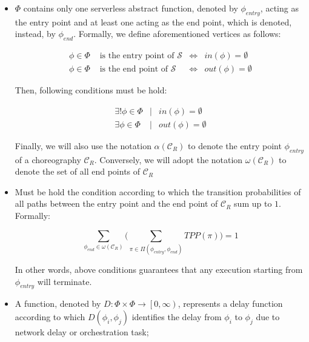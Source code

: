\begin{itemize}
	\item $\Phi$ contains only one serverless abstract function, denoted by $\phi_{entry}$, acting as the entry point and at least one acting as the end point, which is denoted, instead, by $\phi_{end}$. Formally, we define aforementioned vertices as follows: 
	
	\begin{equation}
		\begin{array}{lcll}
			\phi \in \Phi & \text{ is the entry point of } \mathcal{S} & \Leftrightarrow & in(\phi) = \emptyset \\
			\phi \in \Phi & \text{ is the end point of } \mathcal{S} & \Leftrightarrow & out(\phi) = \emptyset
		\end{array}
	\end{equation}
	
	Then, following conditions must be hold:
	
	\begin{eqnarray}
		\exists !  \phi \in \Phi &\mid & in(\phi) = \emptyset \label{cond1} \\
		\exists   \phi \in \Phi & \mid & out(\phi) = \emptyset \label{cond2}
	\end{eqnarray}
	
	Finally, we will also use the notation $\alpha(\mathcal{C}_R)$ to denote the entry point $\phi_{entry}$ of a choreography $\mathcal{C}_R$. Conversely, we will adopt the notation $\omega(\mathcal{C}_R)$ to denote the set of all end points of $\mathcal{C}_R$
		
	\item Must be hold the condition according to which the transition probabilities of all paths between the entry point and	the end point of $\mathcal{C}_R$ sum up to $1$. Formally:
	
	\begin{equation}\label{cond3}
		\sum_{\phi_{end} \in \omega(\mathcal{C}_R)} \Big( \sum_{\pi \in \Pi(\phi_{entry}, \phi_{end})} TPP(\pi) \Big) = 1
	\end{equation}
	
	In other words, above conditions guarantees that any execution starting from $\phi_{entry}$ will terminate.
	
	\item A function, denoted by $D : \Phi \times \Phi \to \left[ 0, \infty \right)$, represents a delay function according to which $D\left(\phi_i, \phi_j \right)$ identifies the delay from $\phi_i$ to $\phi_j$ due to network delay or orchestration task;  
	
\end{itemize} 

